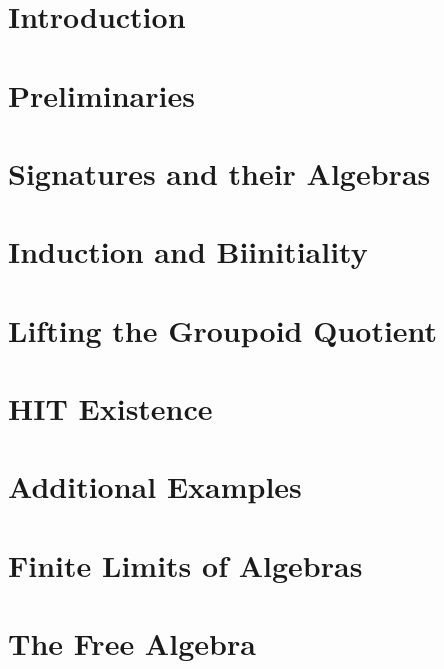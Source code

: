 \documentclass{lmcs}
\theoremstyle{plain}
\theoremstyle{definition}
\begin{document}
\maketitle

\section{Introduction}


\section{Preliminaries}
\label{sec:prelims}


\section{Signatures and their Algebras}
\label{sec:signs}


\section{Induction and Biinitiality}
\label{sec:induction}


\section{Lifting the Groupoid Quotient}
\label{sec:biadj}


\section{HIT Existence}
\label{sec:existence}


\section{Additional Examples}
\label{sec:examples}


\section{Finite Limits of Algebras}
\label{sec:finite_limits}


\section{The Free Algebra}
\label{sec:free_algebra}

\end{document}
